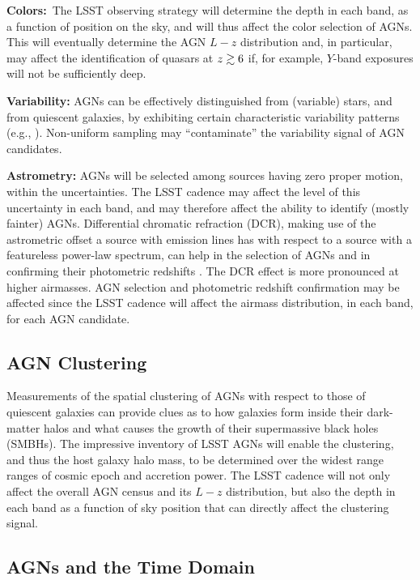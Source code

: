 {\bf Colors:}~The LSST observing strategy will determine the depth in each band, as a function of position on the sky, and will thus affect
the color selection of AGNs. This will eventually determine the AGN $L-z$ distribution and, in particular, may affect the identification
of quasars at $z\gtrsim 6$ if, for example, $Y$-band exposures will not be sufficiently deep.

{\bf Variability:} AGNs can be effectively distinguished from (variable) stars, and from quiescent galaxies, by exhibiting certain characteristic variability patterns (e.g., \citet{ButlerandBloom2011}). Non-uniform sampling may ``contaminate'' the variability signal of AGN candidates.

{\bf Astrometry:} AGNs will be selected among sources having zero proper motion, within the uncertainties. The LSST cadence
may affect the level of this uncertainty in each band, and may therefore affect the ability to identify (mostly fainter) AGNs.
%
Differential chromatic refraction (DCR), making use of the astrometric offset a source with emission lines has with respect to
a source with a featureless power-law spectrum, can help in the selection of AGNs and in confirming their photometric redshifts \citep{KaczmarczikEtal2009}. The DCR effect is more pronounced at higher airmasses. AGN selection and photometric redshift confirmation may be affected since the LSST cadence will affect the airmass distribution, in each band, for each AGN candidate.

\subsection{AGN Clustering}
\label{sec:\secname:clustering}

\noindent Measurements of the spatial clustering of AGNs with respect to those of quiescent galaxies can provide clues as to how galaxies
form inside their dark-matter halos and what causes the growth of their supermassive black holes (SMBHs). The impressive inventory
of LSST AGNs will enable the clustering, and thus the host galaxy halo mass, to be determined over the widest range ranges of cosmic
epoch and accretion power.
%
The LSST cadence will not only affect the overall AGN census and its $L-z$ distribution, but also the
depth in each band as a function of sky position that can directly affect the clustering signal.

\subsection{AGNs and the Time Domain}
\label{sec:\secname:time}

